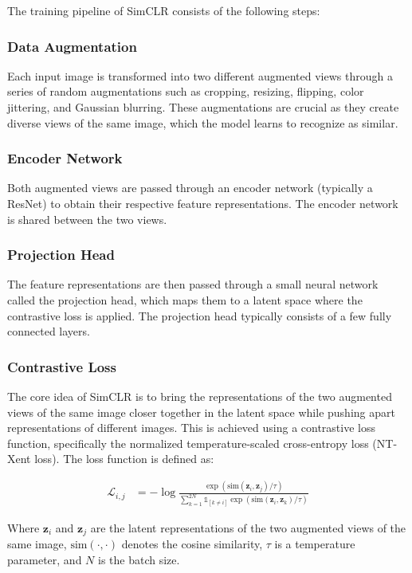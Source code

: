 \documentclass{article}
\begin{document}
The training pipeline of SimCLR consists of the following steps:

\subsubsection{Data Augmentation}
Each input image is transformed into two different augmented views through a
series of random augmentations such as cropping, resizing, flipping, color
jittering, and Gaussian blurring. These augmentations are crucial as they
create diverse views of the same image, which the model learns to recognize as
similar.

\subsubsection{Encoder Network}
Both augmented views are passed through an encoder network (typically a ResNet)
to obtain their respective feature representations. The encoder network is
shared between the two views.

\subsubsection{Projection Head}
The feature representations are then passed through a small neural network
called the projection head, which maps them to a latent space where the
contrastive loss is applied. The projection head typically consists of a few
fully connected layers.

\subsubsection{Contrastive Loss}
The core idea of SimCLR is to bring the representations of the two augmented
views of the same image closer together in the latent space while pushing apart
representations of different images. This is achieved using a contrastive loss
function, specifically the normalized temperature-scaled cross-entropy loss
(NT-Xent loss). The loss function is defined as:

\begin{align}
  \mathcal{L}_{i,j} & = -\log
  \frac{\exp(\text{sim}(\mathbf{z}_i, \mathbf{z}_j) / \tau)}{\sum_{k=1}^{2N}
  \mathbb{1}_{[k \neq i]} \exp(\text{sim}(\mathbf{z}_i, \mathbf{z}_k) / \tau)}
\end{align}

Where $\mathbf{z}_i$ and $\mathbf{z}_j$ are the latent representations of the
two augmented views of the same image, $\text{sim}(\cdot, \cdot)$ denotes the
cosine similarity, $\tau$ is a temperature parameter, and $N$ is the batch
size.
\end{document}
